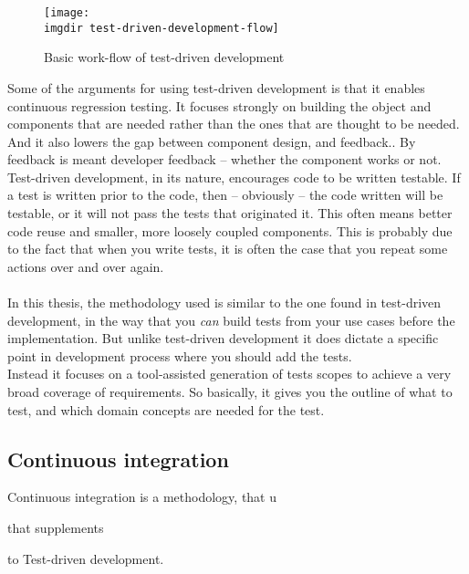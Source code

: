\begin{figure}[!htbp]
\centering
\texttt{[image: \\imgdir test-driven-development-flow]}
\caption{Basic work-flow of test-driven development}
\label{fig:test-driven-development-flow}
\end{figure}Some of the arguments for using test-driven development is that it enables continuous regression testing. It focuses strongly on building the object and components that are needed rather than the ones that are thought to be needed. And it also lowers the gap between component design, and feedback.\cite{george2003}. By feedback is meant developer feedback -- whether the component works or not.\\
Test-driven development, in its nature, encourages code to be written testable. If a test is written prior to the code, then -- obviously -- the code written will be testable, or it will not pass the tests that originated it. This often means better code reuse and smaller, more loosely coupled components. This is probably due to the fact that when you write tests, it is often the case that you repeat some actions over and over again.\\\\
In this thesis, the methodology used is similar to the one found in test-driven development, in the way that you \emph{can} build tests from your use cases before the implementation. But unlike test-driven development it does dictate a specific point in development process where you should add the tests.\\
Instead it focuses on a tool-assisted generation of tests scopes to achieve a very broad coverage of requirements. So basically, it gives you the outline of what to test, and which domain concepts are needed for the test.

\subsection{Continuous integration}
Continuous integration is a methodology, that u

 that supplements

 to Test-driven development.


